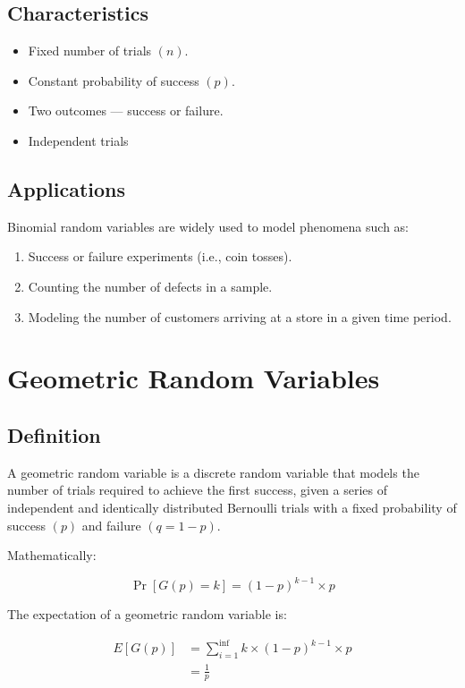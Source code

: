     \subsection*{Characteristics}
        \begin{itemize}
            \item Fixed number of trials \((n)\).
            \item Constant probability of success \((p)\).
            \item Two outcomes --- success or failure.
            \item Independent trials
        \end{itemize}

    \subsection*{Applications}
        Binomial random variables are widely used to model phenomena such as:

        \begin{enumerate}
            \item Success or failure experiments (i.e., coin tosses).
            \item Counting the number of defects in a sample.
            \item Modeling the number of customers arriving at a store in a given time period.
        \end{enumerate}

\section*{Geometric Random Variables}
    \subsection*{Definition}
        A geometric random variable is a discrete random variable that models the number of trials required to achieve the first success, given a series of independent and identically distributed Bernoulli trials with a fixed probability of success \((p)\) and failure \((q = 1 - p)\).

        Mathematically:

        \[
            \Pr[G(p) = k] = (1 - p)^{k - 1} \times p
        \]

        The expectation of a geometric random variable is:

        \[
            \begin{aligned}
                E[G(p)] & = \sum_{i = 1}^{\inf} k \times (1 - p)^{k - 1} \times p\\
                & = \frac{1}{p}
            \end{aligned}
        \]

